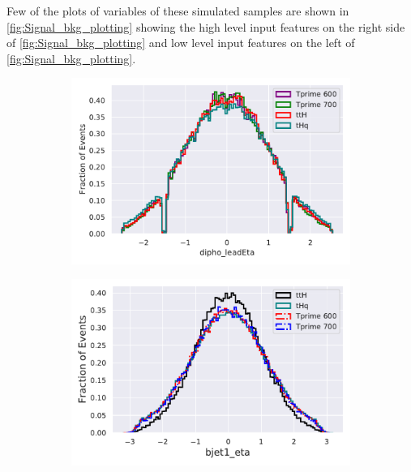 Few of the plots of variables of these simulated samples are shown in  \autoref{fig:Signal_bkg_plotting} showing the high level input features on the right side of \autoref{fig:Signal_bkg_plotting} and low level input features on the left of \autoref{fig:Signal_bkg_plotting}.
\begin{figure}[H]
\begin{subfigure}{.5\textwidth}
  \centering
  \includegraphics[width=.8\linewidth]{Figure_2/dipho_leadEta.pdf}  
  \caption{}
  \label{fig:sub-first}
\end{subfigure}
\begin{subfigure}{.5\textwidth}
  \centering
  \includegraphics[width=.8\linewidth]{Figure_2/bjet1_eta.pdf}  
  \caption{}
  \label{fig:sub-second}
\end{subfigure}




\end{figure}
